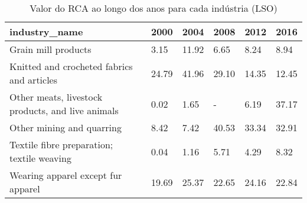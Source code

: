 \begin{table}
\centering
\caption{Valor do RCA ao longo dos anos para cada indústria (LSO)}
\begin{tabular}{p{6cm}p{1.5cm}p{1.5cm}p{1.5cm}p{1.5cm}p{1.5cm}}
\toprule
                                    industry\_name &  2000 &  2004 &  2008 &  2012 &  2016 \\
\midrule
                              Grain mill products &  3.15 & 11.92 &  6.65 &  8.24 &  8.94 \\
       Knitted and crocheted fabrics and articles & 24.79 & 41.96 & 29.10 & 14.35 & 12.45 \\
Other meats, livestock products, and live animals &  0.02 &  1.65 &     - &  6.19 & 37.17 \\
                        Other mining and quarring &  8.42 &  7.42 & 40.53 & 33.34 & 32.91 \\
       Textile fibre preparation; textile weaving &  0.04 &  1.16 &  5.71 &  4.29 &  8.32 \\
               Wearing apparel except fur apparel & 19.69 & 25.37 & 22.65 & 24.16 & 22.84 \\
\bottomrule
\end{tabular}
\end{table}
